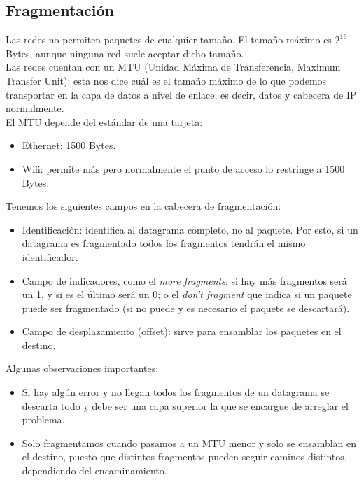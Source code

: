 \subsection{Fragmentación}
Las redes no permiten paquetes de cualquier tamaño. El tamaño máximo es $2^{16}$ Bytes, aunque ninguna red suele aceptar dicho tamaño. \\

Las redes cuentan con un MTU (Unidad Máxima de Transferencia, Maximum Transfer Unit): esta nos dice cuál es el tamaño máximo de lo que podemos transportar en la capa de datos a nivel de enlace, es decir, datos y cabecera de IP normalmente. \\ 

El MTU depende del estándar de una tarjeta:
\begin{itemize}
    \item Ethernet: 1500 Bytes.
    \item Wifi: permite más pero normalmente el punto de acceso lo restringe a 1500 Bytes.
\end{itemize}

\noindent
Tenemos los siguientes campos en la cabecera de fragmentación:
\begin{itemize}
    \item Identificación: identifica al datagrama completo, no al paquete. Por esto, si un datagrama es fragmentado todos los fragmentos tendrán el mismo identificador.
    \item Campo de indicadores, como el \textit{more fragments}: si hay más fragmentos será un 1, y si es el último será un 0; o el \textit{don't fragment} que indica si un paquete puede ser fragmentado (si no puede y es necesario el paquete se descartará).
    \item Campo de desplazamiento (offset): sirve para ensamblar los paquetes en el destino. 
\end{itemize}

Algunas observaciones importantes:
\begin{itemize}
    \item Si hay algún error y no llegan todos los fragmentos de un datagrama se descarta todo y debe ser una capa superior la que se encargue de arreglar el problema.
    \item Solo fragmentamos cuando pasamos a un MTU menor y solo se ensamblan en el destino, puesto que distintos fragmentos pueden seguir caminos distintos, dependiendo del encaminamiento.
\end{itemize}


